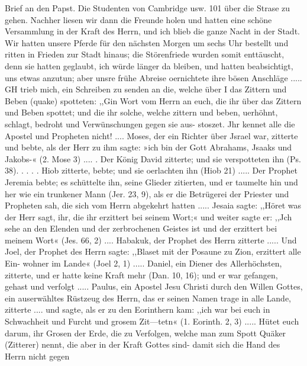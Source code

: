 Brief an den Papst. Die Studenten von Cambridge usw. 101
über die Strase zu gehen. Nachher liesen wir dann die Freunde
holen und hatten eine schöne Versammlung in der Kraft des
Herrn, und ich blieb die ganze Nacht in der Stadt. Wir hatten
unsere Pferde für den nächsten Morgen um sechs Uhr bestellt
und ritten in Frieden zur Stadt hinaus; die Störenfriede wurden
somit enttäuscht, denn sie hatten geglaubt, ich würde länger da
bleiben, und hatten beabsichtigt, uns etwas anzutun; aber unsre
frühe Abreise oernichtete ihre bösen Anschläge .....
GH trieb mich, ein Schreiben zu senden an die, welche über
I das Zittern und Beben (quake) spotteten:
,,Gin Wort vom Herrn an euch, die ihr über das Zittern
und Beben spottet; und die ihr solche, welche zittern und beben,
uerhöhnt, schlagt, bedroht und Verwünschungen gegen sie aus-
stoszet. Jhr kennet alle die Apostel und Propheten nicht! ....
Moses, der ein Richter über Jsrael war, zitterte und bebte,
als der Herr zu ihm sagte: »ich bin der Gott Abrahams, Jsaaks
und Jakobs-« (2. Mose 3) .... . Der König David zitterte;
und sie verspotteten ihn (Ps. 38). . . . . Hiob zitterte, bebte;
und sie oerlachten ihn (Hiob 21) ..... Der Prophet Jeremia
bebte; es schüttelte ihn, seine Glieder zitierten, und er taumelte
hin und her wie ein trunkener Mann (Jer. 23, 9), als er die
Betrügerei der Priester und Propheten sah, die sich vom Herrn
abgekehrt hatten ..... Jesaia sagte: ,,Höret was der Herr
sagt, ihr, die ihr erzittert bei seinem Wort;« und weiter sagte er:
,,Jch sehe an den Elenden und der zerbrochenen Geistes ist und
der erzittert bei meinem Wort« (Jes. 66, 2) .... Habakuk, der
Prophet des Herrn zitterte ..... Und Joel, der Prophet des
Herrn sagte: ,,Blaset mit der Posaune zu Zion, erzittert alle Ein-
wohner im Lande« (Joel 2, 1) ..... Daniel, ein Diener des
Allerhöchsten, zitterte, und er hatte keine Kraft mehr (Dan. 10, 16);
und er war gefangen, gehast und verfolgt .....
Paulus, ein Apostel Jesu Christi durch den Willen Gottes, ein
auserwähltes Rüstzeug des Herrn, das er seinen Namen trage in
alle Lande, zitterte .... und sagte, als er zu den Eorinthern
kam: ,,ich war bei euch in Schwachheit und Furcht und grosem
Zit—tetn« (1. Eorinth. 2, 3) .....
Hütet euch darum, ihr Grosen der Erde, die zu Verfolgen,
welche man zum Spott Quäker (Zitterer) nennt, die aber in der
Kraft Gottes sind- damit sich die Hand des Herrn nicht gegen


